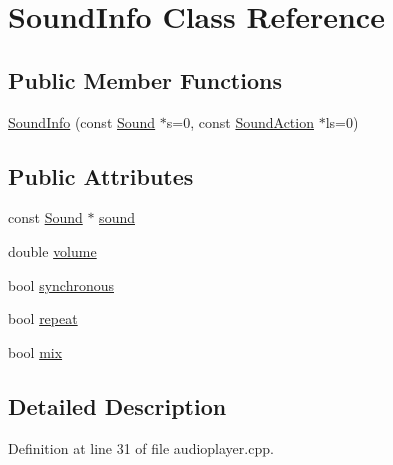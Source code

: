 \hypertarget{classSoundInfo}{\section{Sound\+Info Class Reference}
\label{classSoundInfo}
}
\subsection*{Public Member Functions}
\begin{DoxyCompactItemize}
\item 
\hyperlink{classSoundInfo_ab6c33d6682664c46cd45739eddf58884}{Sound\+Info} (const \hyperlink{classOkular_1_1Sound}{Sound} $\ast$s=0, const \hyperlink{classOkular_1_1SoundAction}{Sound\+Action} $\ast$ls=0)
\end{DoxyCompactItemize}
\subsection*{Public Attributes}
\begin{DoxyCompactItemize}
\item 
const \hyperlink{classOkular_1_1Sound}{Sound} $\ast$ \hyperlink{classSoundInfo_a2cacccbf3b0833dcef00458a098dfcc8}{sound}
\item 
double \hyperlink{classSoundInfo_aa65ec68c376b1377fab3113460305162}{volume}
\item 
bool \hyperlink{classSoundInfo_a1e3333e1e160a58e922610c3121a1114}{synchronous}
\item 
bool \hyperlink{classSoundInfo_a659c959da1310b4cfb1705b11b62a15f}{repeat}
\item 
bool \hyperlink{classSoundInfo_a278bfffef8d5df5ecd17b6ea0b5927e1}{mix}
\end{DoxyCompactItemize}


\subsection{Detailed Description}


Definition at line 31 of file audioplayer.\+cpp.



